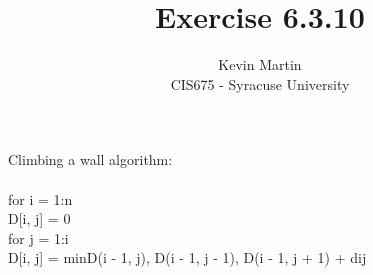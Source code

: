 \documentclass{article}
\author{Kevin Martin\\ CIS675 - Syracuse University}
\title{Exercise 6.3.10}
\newcommand\tab[1][1cm]{\hspace*{#1}}
\begin{document}
\maketitle
Climbing a wall algorithm:\\\\

for i = 1:n\\
\tab D[i, j] = 0\\
\tab for j = 1:i\\
\tab \tab D[i, j] = min{D(i - 1, j), D(i - 1, j - 1),
D(i - 1, j + 1)} + dij
\end{document}
